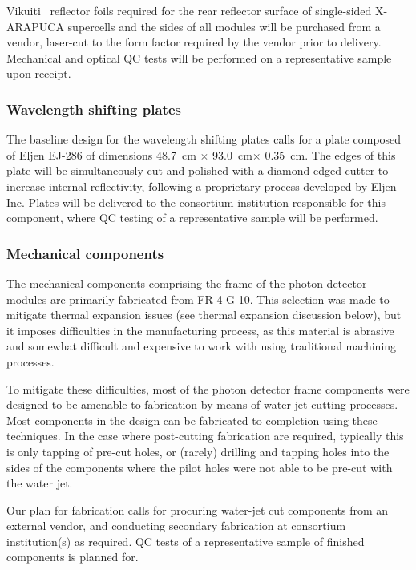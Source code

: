Vikuiti \texttrademark\ reflector foils required for the rear reflector surface of single-sided X-ARAPUCA supercells and the sides of all modules will be purchased from a vendor, laser-cut to the form factor required by the vendor prior to delivery.  Mechanical and optical QC tests will be performed on a representative sample upon receipt.

\subsubsection{Wavelength shifting plates}

The baseline design for the wavelength shifting plates calls for a plate  composed of Eljen EJ-286 of dimensions \SI{48.7}{cm} $\times$ \SI{93.0}{cm}$\times$ \SI{0.35}{cm}.  The edges of this plate will be simultaneously cut and polished with a diamond-edged cutter to increase internal reflectivity, following a proprietary process developed by Eljen Inc.  Plates will be delivered to the consortium institution responsible for this component, where QC testing of a representative sample will be performed.

\subsubsection{Mechanical components}

The mechanical components comprising the frame of the photon detector modules are primarily fabricated from FR-4 G-10.  This selection was made to mitigate thermal expansion issues (see thermal expansion discussion below), but it imposes difficulties in the manufacturing process, as this material is abrasive and somewhat difficult and expensive to work with using traditional machining processes.

To mitigate these difficulties, most of the photon detector frame components were designed to be amenable to fabrication by means of water-jet cutting processes.  Most components in the design can be fabricated to completion using these techniques.  In the case where post-cutting fabrication are required, typically this is only tapping of pre-cut holes, or (rarely) drilling and tapping holes into the sides of the components where the pilot holes were not able to be pre-cut with the water jet.

Our plan for fabrication calls for procuring water-jet cut components from an external vendor, and conducting secondary fabrication at consortium institution(s) as required.  QC tests of a representative sample of finished components is planned for.


